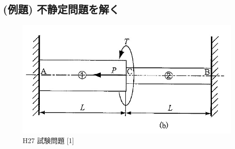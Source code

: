 \documentclass[a4paper]{jsarticle}
\begin{document}
\subsection{(例題) 不静定問題を解く}
\begin{figure}[htbp]
    \begin{center}
        \includegraphics[width=120mm]{images/zairiki_image3.jpg}
        \caption{H27 試験問題 [1]}
    \end{center}
\end{figure}
\end{document}
